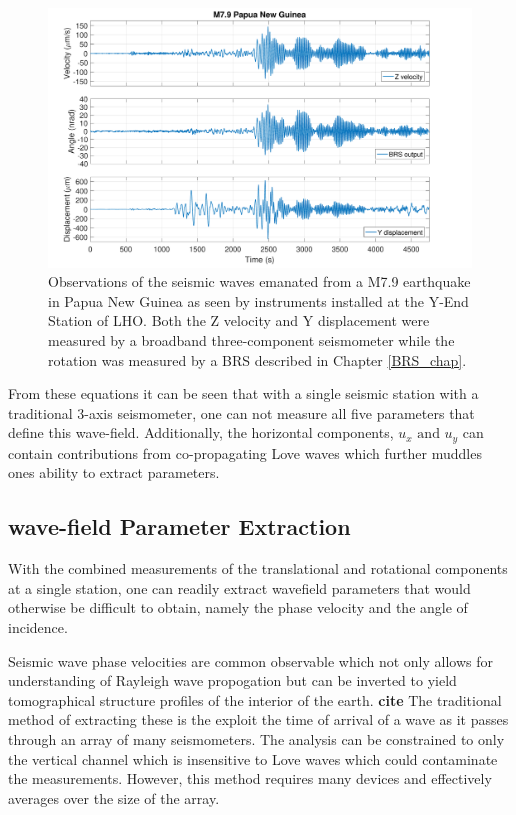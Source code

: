 \documentclass [12pt, proquest]{uwthesis}[2019]
\begin{document}
\begin{figure}%
\begin{center}
\includegraphics[width=\textwidth]{PNGTimeSeries.pdf}
\caption{Observations of the seismic waves emanated from a M7.9 earthquake in Papua New Guinea as seen by instruments installed at the Y-End Station of LHO. \cite{tiltSeismology} Both the Z velocity and Y displacement were measured by a broadband three-component seismometer while the rotation was measured by a BRS described in Chapter \ref{BRS_chap}. }
\label{Earthquake}
\end{center}
\end{figure}

From these equations it can be seen that with a single seismic station with a traditional 3-axis seismometer, one can not measure all five parameters that define this wave-field. Additionally, the horizontal components, $u_x\text{ and }u_y$ can contain contributions from co-propagating Love waves which further muddles ones ability to extract parameters. 


\subsection{wave-field Parameter Extraction}

With the combined measurements of the translational and rotational components at a single station, one can readily extract wavefield parameters that would otherwise be difficult to obtain, namely the phase velocity and the angle of incidence. 

Seismic wave phase velocities are common observable which not only allows for understanding of Rayleigh wave propogation but can be inverted to yield tomographical structure profiles of the interior of the earth. \textbf{cite} The traditional method of extracting these is the exploit the time of arrival of a wave as it passes through an array of many seismometers. The analysis can be constrained to only the vertical channel which is insensitive to Love waves which could contaminate the measurements. However, this method requires many devices and effectively averages over the size of the array.
\end{document}
